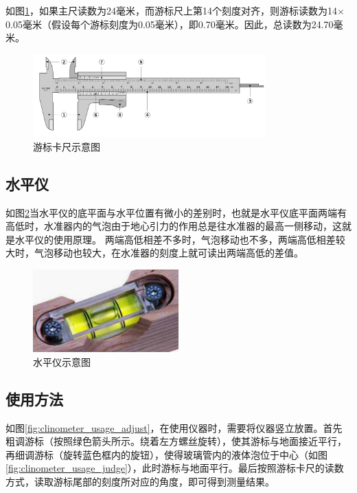 \documentclass[UTF8]{ctexart}
\begin{document}
如图\ref{fig:vernier_caliper}，如果主尺读数为24毫米，而游标尺上第14个刻度对齐，则游标读数为14$\times$0.05毫米（假设每个游标刻度为0.05毫米），即0.70毫米。因此，总读数为24.70毫米。\cite{Vernier-scale}

\begin{figure}[h]
    \centering
    \includegraphics[width=0.8\textwidth]{img/vernier_caliper.png}
    \caption{游标卡尺示意图}
    \label{fig:vernier_caliper}
\end{figure}

\subsection{水平仪}

如图\ref{fig:bubble_level}当水平仪的底平面与水平位置有微小的差别时，也就是水平仪底平面两端有高低时，水准器内的气泡由于地心引力的作用总是往水准器的最高一侧移动，这就是水平仪的使用原理。 两端高低相差不多时，气泡移动也不多，两端高低相差较大时，气泡移动也较大，在水准器的刻度上就可读出两端高低的差值。\cite{bubble-level}

\begin{figure}[h]
    \centering
    \includegraphics[width=0.5\textwidth]{img/bubble_level.png}
    \caption{水平仪示意图}
    \label{fig:bubble_level}
\end{figure}

\subsection{使用方法}

如图\ref{fig:clinometer_usage_adjust}，在使用仪器时，需要将仪器竖立放置。首先粗调游标（按照绿色箭头所示。绕着左方螺丝旋转），使其游标与地面接近平行，再细调游标（旋转蓝色框内的旋钮），使得玻璃管内的液体泡位于中心（如图\ref{fig:clinometer_usage_judge}），此时游标与地面平行。最后按照游标卡尺的读数方式，读取游标尾部的刻度所对应的角度，即可得到测量结果。
\end{document}
